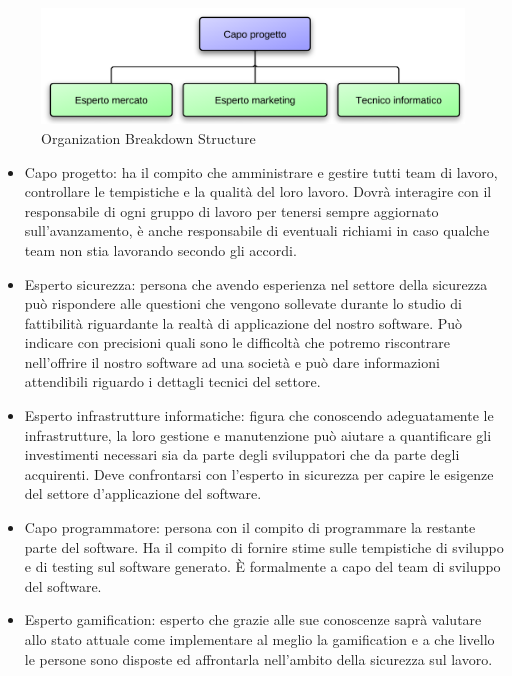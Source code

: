 \vspace*{0.5cm}

\begin{figure}[H]
\centering
\includegraphics[scale=1]{images/obs.png}
\caption{Organization Breakdown Structure}
\end{figure}

\vspace*{0.5cm}

\begin{itemize}
\item Capo progetto: ha il compito che amministrare e gestire tutti team di lavoro, controllare le tempistiche e la qualità del loro lavoro. Dovrà interagire con il responsabile di ogni gruppo di lavoro per tenersi sempre aggiornato sull'avanzamento, è anche responsabile di eventuali richiami in caso qualche team non stia lavorando secondo gli accordi.
\item Esperto sicurezza: persona che avendo esperienza nel settore della sicurezza può rispondere alle questioni che vengono sollevate durante lo studio di fattibilità riguardante la realtà di applicazione del nostro software. Può indicare con precisioni quali sono le difficoltà che potremo riscontrare nell'offrire il nostro software ad una società e può dare informazioni attendibili riguardo i dettagli tecnici del settore. 
\item Esperto infrastrutture informatiche: figura che conoscendo adeguatamente le infrastrutture, la loro gestione e manutenzione può aiutare a quantificare gli investimenti necessari sia da parte degli sviluppatori che da parte degli acquirenti. Deve confrontarsi con l'esperto in sicurezza per capire le esigenze del settore d'applicazione del software.
\item Capo programmatore: persona con il compito di programmare la restante parte del software. Ha il compito di fornire stime sulle tempistiche di sviluppo e di testing sul software generato. È formalmente a capo del team di sviluppo del software.
\item Esperto gamification: esperto che grazie alle sue conoscenze saprà valutare allo stato attuale come implementare al meglio la gamification e a che livello le persone sono disposte ed affrontarla nell'ambito della sicurezza sul lavoro.
\end{itemize}

